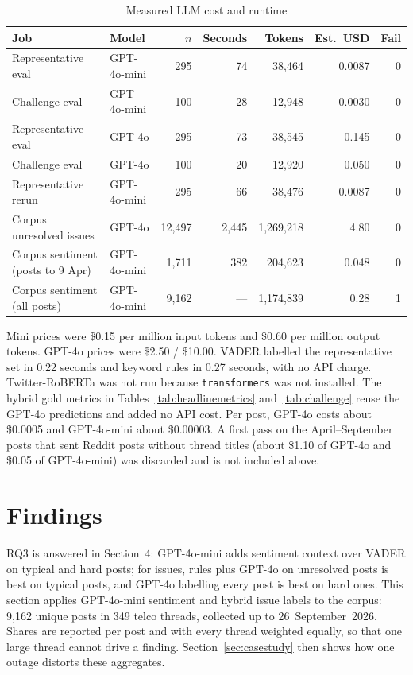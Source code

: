\documentclass[11pt,a4paper]{article}
\begin{document}
\begin{table}[H]
\centering
\caption{Measured LLM cost and runtime}
\label{tab:cost}
\begin{tabular}{llrrrrr}
\toprule
\textbf{Job} & \textbf{Model} & \textbf{$n$} & \textbf{Seconds} & \textbf{Tokens} & \textbf{Est.\ USD} & \textbf{Fail} \\
\midrule
Representative eval & GPT-4o-mini & 295 & 74 & 38,464 & 0.0087 & 0 \\
Challenge eval & GPT-4o-mini & 100 & 28 & 12,948 & 0.0030 & 0 \\
Representative eval & GPT-4o & 295 & 73 & 38,545 & 0.145 & 0 \\
Challenge eval & GPT-4o & 100 & 20 & 12,920 & 0.050 & 0 \\
Representative rerun & GPT-4o-mini & 295 & 66 & 38,476 & 0.0087 & 0 \\
Corpus unresolved issues & GPT-4o & 12,497 & 2,445 & 1,269,218 & 4.80 & 0 \\
Corpus sentiment (posts to 9 Apr) & GPT-4o-mini & 1,711 & 382 & 204,623 & 0.048 & 0 \\
Corpus sentiment (all posts) & GPT-4o-mini & 9,162 & --- & 1,174,839 & 0.28 & 1 \\
\bottomrule
\end{tabular}
\end{table}

Mini prices were \$0.15 per million input tokens and \$0.60 per million output tokens. GPT-4o prices were \$2.50 / \$10.00. VADER labelled the representative set in 0.22 seconds and keyword rules in 0.27 seconds, with no API charge. Twitter-RoBERTa was not run because \texttt{transformers} was not installed. The hybrid gold metrics in Tables~\ref{tab:headlinemetrics} and~\ref{tab:challenge} reuse the GPT-4o predictions and added no API cost. Per post, GPT-4o costs about \$0.0005 and GPT-4o-mini about \$0.00003. A first pass on the April--September posts that sent Reddit posts without thread titles (about \$1.10 of GPT-4o and \$0.05 of GPT-4o-mini) was discarded and is not included above.

\section{Findings}

RQ3 is answered in Section~4: GPT-4o-mini adds sentiment context over VADER on typical and hard posts; for issues, rules plus GPT-4o on unresolved posts is best on typical posts, and GPT-4o labelling every post is best on hard ones. This section applies GPT-4o-mini sentiment and hybrid issue labels to the corpus: 9,162 unique posts in 349 telco threads, collected up to 26~September~2026. Shares are reported per post and with every thread weighted equally, so that one large thread cannot drive a finding. Section~\ref{sec:casestudy} then shows how one outage distorts these aggregates.
\end{document}
